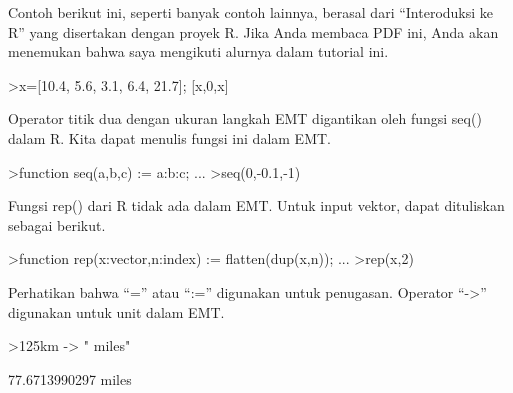 \documentclass[a4paper,10pt]{article}
\begin{document}
\begin{eulernotebook}
\begin{eulercomment}
\begin{eulercomment}
\begin{eulercomment}
\begin{eulercomment}
\begin{eulercomment}
\begin{eulercomment}
\begin{eulercomment}
\begin{eulercomment}
\begin{eulercomment}
\begin{eulercomment}
\begin{eulercomment}
\begin{eulercomment}
\begin{eulercomment}
\begin{eulercomment}
\begin{eulercomment}
\begin{eulercomment}
\begin{eulercomment}
\begin{eulercomment}
\begin{eulercomment}
\begin{eulercomment}
\begin{eulercomment}
\begin{eulercomment}
\begin{eulercomment}
Contoh berikut ini, seperti banyak contoh lainnya, berasal dari
“Interoduksi ke R” yang disertakan dengan proyek R. Jika Anda membaca
PDF ini, Anda akan menemukan bahwa saya mengikuti alurnya dalam
tutorial ini.
\end{eulercomment}
\begin{eulerprompt}
>x=[10.4, 5.6, 3.1, 6.4, 21.7]; [x,0,x]
\end{eulerprompt}
\begin{euleroutput}
  [10.4,  5.6,  3.1,  6.4,  21.7,  0,  10.4,  5.6,  3.1,  6.4,  21.7]
\end{euleroutput}
\begin{eulercomment}
Operator titik dua dengan ukuran langkah EMT digantikan oleh fungsi
seq() dalam R. Kita dapat menulis fungsi ini dalam EMT.
\end{eulercomment}
\begin{eulerprompt}
>function seq(a,b,c) := a:b:c; ...
>seq(0,-0.1,-1)
\end{eulerprompt}
\begin{euleroutput}
  [0,  -0.1,  -0.2,  -0.3,  -0.4,  -0.5,  -0.6,  -0.7,  -0.8,  -0.9,  -1]
\end{euleroutput}
\begin{eulercomment}
Fungsi rep() dari R tidak ada dalam EMT. Untuk input vektor, dapat
dituliskan sebagai berikut.
\end{eulercomment}
\begin{eulerprompt}
>function rep(x:vector,n:index) := flatten(dup(x,n)); ...
>rep(x,2)
\end{eulerprompt}
\begin{euleroutput}
  [10.4,  5.6,  3.1,  6.4,  21.7,  10.4,  5.6,  3.1,  6.4,  21.7]
\end{euleroutput}
\begin{eulercomment}
Perhatikan bahwa “=” atau “:=” digunakan untuk penugasan. Operator
“-\textgreater{}” digunakan untuk unit dalam EMT.
\end{eulercomment}
\begin{eulerprompt}
>125km -> " miles"
\end{eulerprompt}
\begin{euleroutput}
  77.6713990297 miles
\end{euleroutput}
\begin{eulercomment}

\end{eulercomment}
\end{eulercomment}
\end{eulercomment}
\end{eulercomment}
\end{eulercomment}
\end{eulercomment}
\end{eulercomment}
\end{eulercomment}
\end{eulercomment}
\end{eulercomment}
\end{eulercomment}
\end{eulercomment}
\end{eulercomment}
\end{eulercomment}
\end{eulercomment}
\end{eulercomment}
\end{eulercomment}
\end{eulercomment}
\end{eulercomment}
\end{eulercomment}
\end{eulercomment}
\end{eulercomment}
\end{eulercomment}
\end{eulernotebook}
\end{document}
